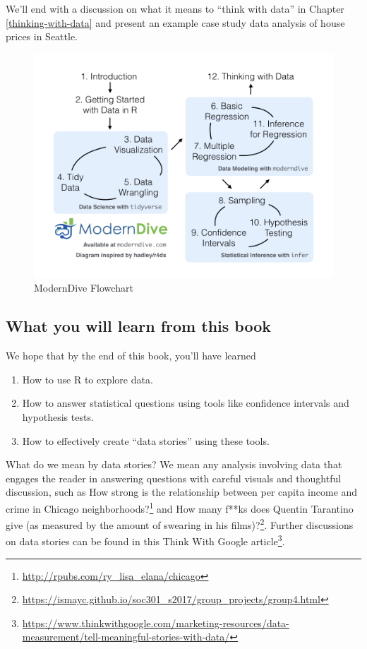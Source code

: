 \documentclass[12pt, krantz2,]{krantz}
\providecommand{\tightlist}{%
  \setlength{\itemsep}{0pt}\setlength{\parskip}{0pt}}
\renewcommand{\href}[2]{#2\footnote{\url{#1}}}
\begin{document}
We'll end with a discussion on what it means to ``think with data'' in Chapter \ref{thinking-with-data} and present an example case study data analysis of house prices in Seattle.

\begin{figure}

{\centering \includegraphics[width=\textwidth]{images/flowcharts/flowchart/flowchart.002} 

}

\caption{ModernDive Flowchart}\label{fig:moderndive-figure}
\end{figure}

\hypertarget{subsec:learning-goals}{%
\subsection{What you will learn from this book}\label{subsec:learning-goals}}

We hope that by the end of this book, you'll have learned

\begin{enumerate}
\def\labelenumi{\arabic{enumi}.}
\tightlist
\item
  How to use R to explore data.\\
\item
  How to answer statistical questions using tools like confidence intervals and hypothesis tests.
\item
  How to effectively create ``data stories'' using these tools.
\end{enumerate}

What do we mean by data stories? We mean any analysis involving data that engages the reader in answering questions with careful visuals and thoughtful discussion, such as \href{http://rpubs.com/ry_lisa_elana/chicago}{How strong is the relationship between per capita income and crime in Chicago neighborhoods?} and \href{https://ismayc.github.io/soc301_s2017/group_projects/group4.html}{How many f**ks does Quentin Tarantino give (as measured by the amount of swearing in his films)?}. Further discussions on data stories can be found in this \href{https://www.thinkwithgoogle.com/marketing-resources/data-measurement/tell-meaningful-stories-with-data/}{Think With Google article}.
\end{document}
